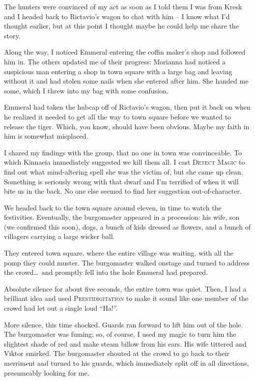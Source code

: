 The hunters were convinced of my act as soon as I told them I was from Kresk and I headed back to Rictavio's wagon to chat with him -- I know what I'd thought earlier, but at this point I thought maybe he could help me share the story.

Along the way, I noticed Emmeral entering the coffin maker's shop and followed him in. The others updated me of their progress: Morianna had noticed a suspicious man entering a shop in town square with a large bag and leaving without it and had stolen some nails when she entered after him. She handed me some, which I threw into my bag with some confusion.

Emmeral had taken the hubcap off of Rictavio's wagon, then put it back on when he realized it needed to get all the way to town square before we wanted to release the tiger. Which, you know, should have been obvious. Maybe my faith in him is somewhat misplaced.

I shared my findings with the group, that no one in town was convinceable. To which Kinnaeia immediately suggested we kill them all. I cast \textsc{Detect Magic} to find out what mind-altering spell she was the victim of, but she came up clean. Something is seriously wrong with that dwarf and I'm terrified of when it will bite us in the back. No one else seemed to find her suggestion out-of-character.

We headed back to the town square around eleven, in time to watch the festivities. Eventually, the burgomaster appeared in a procession: his wife, son (we confirmed this soon), dogs, a bunch of kids dressed as flowers, and a bunch of villagers carrying a large wicker ball.

They entered town square, where the entire village was waiting, with all the pomp they could muster. The burgomaster walked onstage and turned to address the crowd\dots\ and promptly fell into the hole Emmeral had prepared.

Absolute silence for about five seconds, the entire town was quiet. Then, I had a brilliant idea and used \textsc{Prestidigitation} to make it sound like one member of the crowd had let out a single loud ``Ha!''.

More silence, this time shocked. Guards ran forward to lift him out of the hole. The burgomaster was fuming; so, of course, I used my magic to turn him the slightest shade of red and make steam billow from his ears. His wife tittered and Viktor smirked. The burgomaster shouted at the crowd to go back to their merriment and turned to his guards, which immediately split off in all directions, presumeably looking for me.

